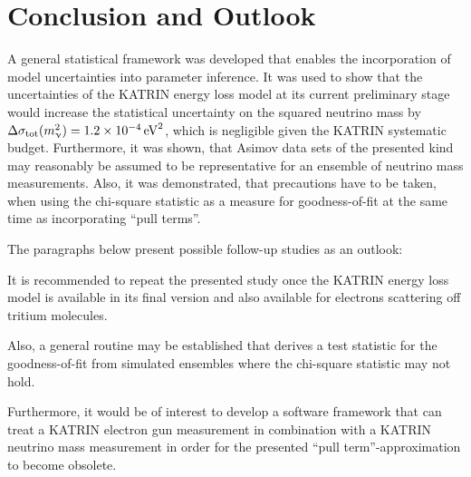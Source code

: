 \section{Conclusion and Outlook}
\label{sec:katrinElossModelOutlook}
A general statistical framework was developed that enables the incorporation of model uncertainties into parameter inference. It was used to show that the uncertainties of the KATRIN energy loss model at its current preliminary stage would increase the statistical uncertainty on the squared neutrino mass by $\Delta \sigma_\mathrm{tot}(m_\upnu^2) = \SI{1.2e-4}{eV^2}$, which is negligible given the KATRIN systematic budget. Furthermore, it was shown, that Asimov data sets of the presented kind may reasonably be assumed to be representative for an ensemble of neutrino mass measurements. Also, it was demonstrated, that precautions have to be taken, when using the chi-square statistic as a measure for goodness-of-fit at the same time as incorporating ``pull terms''. 

The paragraphs below present possible follow-up studies as an outlook:

It is recommended to repeat the presented study once the KATRIN energy loss model is available in its final version and also available for electrons scattering off tritium molecules.

Also, a general routine may be established that derives a test statistic for the goodness-of-fit from simulated ensembles where the chi-square statistic may not hold. 

Furthermore, it would be of interest to develop a software framework that can treat a KATRIN electron gun measurement in combination with a KATRIN neutrino mass measurement in order for the presented ``pull term''-approximation to become obsolete.